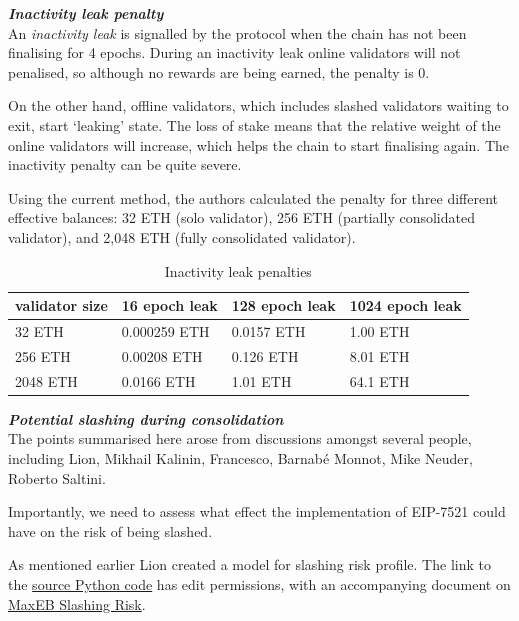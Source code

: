 \noindent
\textbf{\textit{Inactivity leak penalty}} \\
An \textit{inactivity leak} is signalled by the protocol when the chain has not been finalising for 4 epochs. During an inactivity leak online validators will not penalised, so although no rewards are being earned, the penalty is 0. 

On the other hand, offline validators, which includes slashed validators waiting to exit, start `leaking' state. The loss of stake means that the relative weight of the online validators will increase, which helps the chain to start finalising again. The inactivity penalty can be quite severe. 

Using the current method, the authors calculated the penalty for three different effective balances: 32 ETH (solo validator), 256 ETH (partially consolidated validator),  and 2,048 ETH (fully consolidated validator).

\begin{table}[htp]
\caption{Inactivity leak penalties}
\begin{center}
\renewcommand{\arraystretch}{1.3}
\begin{tabular}{|l|l|l|l|}
\hline
\textbf{validator size} & \textbf{16 epoch leak} & \textbf{128 epoch leak} & \textbf{1024 epoch leak} \\
\hline
32 ETH & 0.000259 ETH & 0.0157 ETH & 1.00 ETH \\
256 ETH & 0.00208 ETH & 0.126 ETH & 8.01 ETH \\
2048 ETH & 0.0166 ETH & 1.01 ETH & 64.1 ETH \\
\hline
\end{tabular}
\end{center}
\label{default}
\end{table}%

\noindent
\textbf{\textit{Potential slashing during consolidation}} \\
\label{consolidationslashing}
The points summarised here arose from discussions amongst several people, including Lion, Mikhail Kalinin, Francesco, Barnabé Monnot, Mike Neuder, Roberto Saltini.

Importantly, we need to assess what effect the implementation of EIP-7521 could have on the risk of being slashed.

As mentioned earlier Lion created a model for slashing risk profile. The link to the \href{https://colab.research.google.com/drive/1lBe4qH4oqI8D9cmcQGca3O1AdR3SVr5z?usp=sharing}{source Python code} has edit permissions, with an accompanying document on \href{https://hackmd.io/@dapplion/maxeb_slashing_risks}{MaxEB Slashing Risk}. \\

